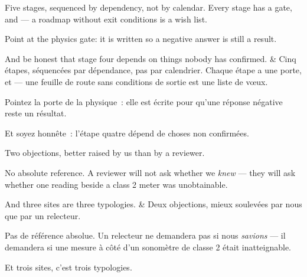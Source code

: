 \documentclass[10pt,a4paper]{article}
\begin{document}
\begin{say}
Five stages, sequenced by dependency, not by calendar. Every stage has a gate, and
 --- a roadmap without exit conditions is a wish
list.

Point at the physics gate: it is written so a negative answer is still a result.

And be honest that stage four depends on things nobody has confirmed.
&
Cinq étapes, séquencées par dépendance, pas par calendrier. Chaque étape a une
porte, et  --- une feuille de route sans
conditions de sortie est une liste de vœux.

Pointez la porte de la physique~: elle est écrite pour qu'une réponse négative
reste un résultat.

Et soyez honnête~: l'étape quatre dépend de choses non confirmées. 
\end{say}

\begin{say}
Two objections, better raised by us than by a reviewer.

No absolute reference. A reviewer will not ask whether we \emph{knew} --- they will
ask whether one reading beside a class 2 meter was unobtainable. 

And three sites are three typologies. 
&
Deux objections, mieux soulevées par nous que par un relecteur.

Pas de référence absolue. Un relecteur ne demandera pas si nous \emph{savions} ---
il demandera si une mesure à côté d'un sonomètre de classe 2 était inatteignable.

Et trois sites, c'est trois typologies. 
\end{say}
\end{document}
